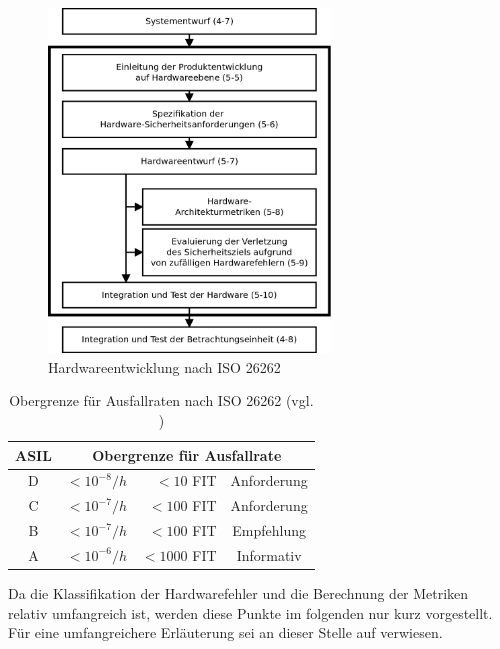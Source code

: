 \documentclass[a4paper,DIV=calc,ngerman]{scrartcl}
\begin{document}
\begin{figure}[h]
\centering
\includegraphics[width=7.5cm]{Abb_6_4}
\caption{Hardwareentwicklung nach ISO 26262\cite{1}}
\label{fig:hardware}
\end{figure}

\begin{table}[h]
\center
\begin{tabular}[h]{c r r c}
\toprule
ASIL & \multicolumn{3}{c}{Obergrenze für Ausfallrate}\\
\midrule
D & $ <10^{-8}/h $ & $ <10 $ FIT & Anforderung\\
C & $ <10^{-7}/h $ & $ <100 $ FIT   & Anforderung\\
B & $ <10^{-7}/h $ & $ <100 $ FIT   & Empfehlung\\
A & $ <10^{-6}/h $ & $ <1000 $ FIT   & Informativ\\
\bottomrule
\end{tabular}
\caption{Obergrenze für Ausfallraten nach ISO 26262 (vgl. \cite[S. 133]{1})}
\label{tab:ausfallrate}
\end{table}

Da die Klassifikation der Hardwarefehler und die Berechnung der Metriken relativ umfangreich ist, werden diese Punkte im folgenden nur kurz vorgestellt. Für eine umfangreichere Erläuterung sei an dieser Stelle auf \cite[S. 135 ff.]{1} verwiesen.
\end{document}
